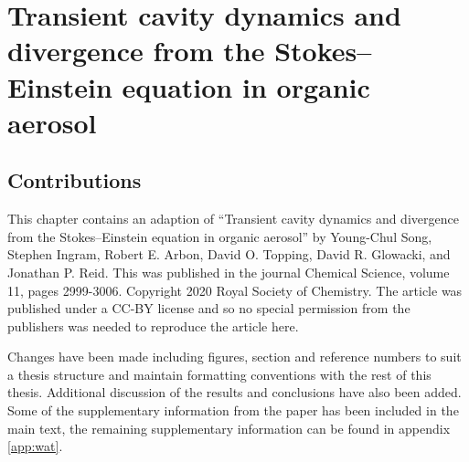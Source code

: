 %
%
\let\textcircled=\pgftextcircled
\chapter{Transient cavity dynamics and divergence from the Stokes–Einstein equation in organic aerosol}
\label{chap:water}


\section*{Contributions}

This chapter contains an adaption of ``Transient cavity dynamics and divergence from the Stokes–Einstein equation in organic aerosol'' by Young-Chul Song, Stephen Ingram, Robert E. Arbon, David O. Topping, David R. Glowacki, and Jonathan P. Reid. This was published in the journal Chemical Science, volume 11, pages 2999-3006. Copyright 2020 Royal Society of Chemistry. The article was published under a CC-BY license and so no special permission from the publishers was needed to reproduce the article here. 

Changes have been made including figures, section and reference numbers to suit a thesis structure and maintain formatting conventions with the rest of this thesis. Additional discussion of the results and conclusions have also been added. Some of the supplementary information from the paper has  been included in the main text, the remaining supplementary information can be found in appendix \ref{app:wat}. 

